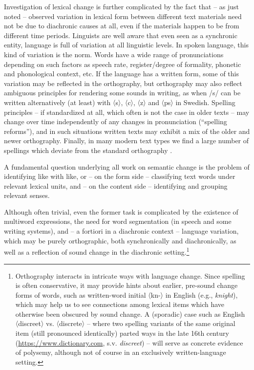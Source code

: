 \documentclass[output=paper]{langsci/langscibook}
\begin{document}
Investigation of lexical change is further complicated by the fact
that -- as just noted -- observed variation in lexical form between
different text materials need not be due to diachronic causes at all,
even if the materials happen to be from different time
periods. Linguists are well aware that even seen as a synchronic
entity, language is full of variation at all linguistic levels. In
spoken language, this kind of variation is the norm. Words have a wide
range of pronunciations depending on such factors as speech rate,
register/degree of formality, phonetic and phonological context,
etc. If the language has a written form, some of this variation may be
reflected in the orthography, but orthography may also reflect
ambiguous principles for rendering some sounds in writing, as when /s/
can be written alternatively (at least) with 〈s〉, 〈c〉, 〈z〉 and 〈ps〉 in
Swedish. Spelling principles -- if standardized at all, which often is
not the case in older texts -- may change over time independently of
any changes in pronunciation (``spelling reforms''), and in such
situations written texts may exhibit a mix of the older and newer
orthography. Finally, in many modern text types we find a large number
of spellings which deviate from the standard orthography
\citep{eisenstein-2015}.

A fundamental question underlying all work on semantic change is the
problem of identifying like with like, or -- on the form side --
classifying text words under relevant lexical units, and -- on the
content side -- identifying and grouping relevant senses.

Although often trivial, even the former task is complicated by the
existence of multiword expressions, the need for word segmentation (in
speech and some writing systems), and -- a fortiori in a
diachronic context -- language variation, which may be purely
orthographic, both synchronically and diachronically, as well as a
reflection of sound change in the diachronic setting.\footnote{Orthography interacts in intricate ways with language change. Since spelling is often conservative, it may provide hints about earlier, pre-sound change forms of words, such as written-word initial 〈kn-〉 in English (e.g., \emph{knight}), which may help us to see connections among lexical items which have otherwise been obscured by sound change. A (sporadic) case such as English 〈discreet〉 vs. 〈discrete〉 -- where two spelling variants of the same original item (still pronounced identically) parted ways in the late 16th century  (\url{https://www.dictionary.com}, s.v. \emph{discreet}) -- will serve as concrete evidence of polysemy, although not of course in an exclusively written-language setting.} 
\end{document}
